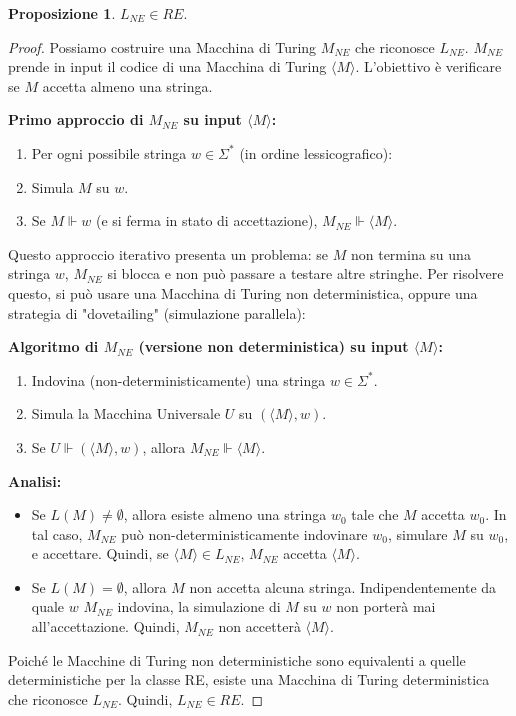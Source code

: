 \documentclass[a4paper]{article}
\theoremstyle{definition} %
\newtheorem{proposition}[theorem]{Proposizione}
\begin{document}
\begin{proposition}
$L_{NE} \in RE$.
\end{proposition}
\begin{proof}
Possiamo costruire una Macchina di Turing $M_{NE}$ che riconosce $L_{NE}$. $M_{NE}$ prende in input il codice di una Macchina di Turing $\langle M \rangle$. L'obiettivo è verificare se $M$ accetta almeno una stringa.

\textbf{Primo approccio di $M_{NE}$ su input $\langle M \rangle$:}
\begin{enumerate}
    \item Per ogni possibile stringa $w \in \Sigma^*$ (in ordine lessicografico):
    \item Simula $M$ su $w$.
    \item Se $M \Vdash w$ (e si ferma in stato di accettazione), $M_{NE} \Vdash \langle M \rangle$.
\end{enumerate}

Questo approccio iterativo presenta un problema: se $M$ non termina su una stringa $w$, $M_{NE}$ si blocca e non può passare a testare altre stringhe.
Per risolvere questo, si può usare una Macchina di Turing non deterministica, oppure una strategia di "dovetailing" (simulazione parallela):

\textbf{Algoritmo di $M_{NE}$ (versione non deterministica) su input $\langle M \rangle$:}
\begin{enumerate}
    \item Indovina (non-deterministicamente) una stringa $w \in \Sigma^*$.
    \item Simula la Macchina Universale $U$ su $(\langle M \rangle, w)$.
    \item Se $U \Vdash (\langle M \rangle, w)$, allora $M_{NE} \Vdash \langle M \rangle$.
\end{enumerate}

\textbf{Analisi:}
\begin{itemize}
    \item Se $L(M) \neq \emptyset$, allora esiste almeno una stringa $w_0$ tale che $M$ accetta $w_0$. In tal caso, $M_{NE}$ può non-deterministicamente indovinare $w_0$, simulare $M$ su $w_0$, e accettare. Quindi, se $\langle M \rangle \in L_{NE}$, $M_{NE}$ accetta $\langle M \rangle$.
    \item Se $L(M) = \emptyset$, allora $M$ non accetta alcuna stringa. Indipendentemente da quale $w$ $M_{NE}$ indovina, la simulazione di $M$ su $w$ non porterà mai all'accettazione. Quindi, $M_{NE}$ non accetterà $\langle M \rangle$.
\end{itemize}
Poiché le Macchine di Turing non deterministiche sono equivalenti a quelle deterministiche per la classe RE, esiste una Macchina di Turing deterministica che riconosce $L_{NE}$. Quindi, $L_{NE} \in RE$.
\end{proof}
\end{document}
